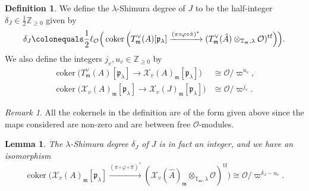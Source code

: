 \documentclass[a4paper, notitlepage, 10pt]{amsart}
\theoremstyle{plain} %
\newtheorem{lemma}[theorem]{Lemma}
\theoremstyle{definition} %
\newtheorem{definition}[theorem]{Definition}
\theoremstyle{remark} %
\newtheorem{remark}[theorem]{Remark}
\numberwithin{equation}{section}
\newcommand{\bbT}{\mathbb T}
\newcommand{\bbZ}{\mathbb Z}
\newcommand{\coker}{\operatorname{coker}} %
\newcommand{\tf}{\operatorname{tf}} %
\begin{document}
\begin{definition}
    We define the $\lambda$-Shimura degree of $J$ to be the half-integer $\delta_J \in \tfrac{1}{2}\mathbb{Z}_{\ge 0}$ given by
    $$ \delta_J \colonequals \frac{1}{2}\ell_{\mathcal{O}}\Big(\coker\Big( T^\vee_{\mathfrak{m}}(A)[\mathfrak{p}_\lambda]\xrightarrow{(\pi\circ\varphi\circ \hat{\pi})^*}(T^\vee_{\mathfrak{m}}(\hat{A}) \otimes_{\bbT_{\mathfrak{m}},\lambda}\mathcal{O})^{\tf}\Big)\Big). $$
    We also define the integers $j_v,u_v\in \bbZ_{\ge 0}$ by
    \begin{align*}
        \coker\big( T^\vee_{\mathfrak{m}}(A)[\mathfrak{p}_\lambda] \to \mathcal{X}_v(A)_{\mathfrak{m}}[\mathfrak{p}_\lambda]\big)&\cong \mathcal{O}/\varpi^{u_v},
        \\ \coker\big( \mathcal{X}_v(A)_{\mathfrak{m}}[\mathfrak{p}_\lambda]\to \mathcal{X}_v(J)_{\mathfrak{m}}[\mathfrak{p}_\lambda]\big) &\cong \mathcal{O}/\varpi^{j_v}.
    \end{align*}
\begin{remark}
    All the cokernels in the definition are of the form given above since the maps considered are non-zero and are between free $\mathcal{O}$-modules.
\end{remark}
\end{definition}
\begin{lemma}\label{shimuradegonX}
    The $\lambda$-Shimura degree $\delta_J$ of $J$ is in fact an integer, and we have an isomorphism 
    $$ \coker\Big( \mathcal{X}_{v}(A)_{\mathfrak{m}} [\mathfrak{p}_\lambda]\xrightarrow{(\pi\circ\varphi\circ \hat{\pi})^*} (\mathcal{X}_v(\hat{A})_{\mathfrak{m}} \otimes_{\bbT_{\mathfrak{m}},\lambda}\mathcal{O})^{\tf}\Big)\cong \mathcal{O}/\varpi^{\delta_J-u_v}. $$
\end{lemma}
\end{document}
